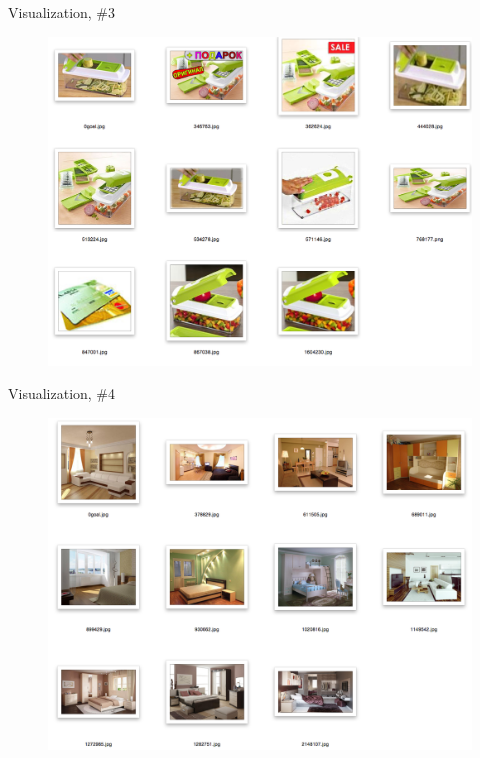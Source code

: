 \documentclass{beamer}
\begin{document}
\begin{frame}{Visualization, \#3}

\begin{figure}[h!]
  \centering
  \includegraphics[width=1\textwidth]{images/search3.png}
\end{figure}

\end{frame}


\begin{frame}{Visualization, \#4}

\begin{figure}[h!]
  \centering
  \includegraphics[width=1\textwidth]{images/search4.png}
\end{figure}

\end{frame}
\end{document}
